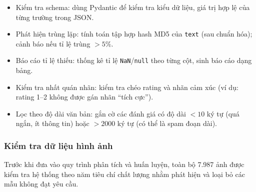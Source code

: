 \begin{itemize}[labelsep=10pt, leftmargin=2cm]
    \item Kiểm tra schema: dùng Pydantic để kiểm tra kiểu dữ liệu, giá trị hợp lệ của từng trường trong JSON.
    \item Phát hiện trùng lặp: tính toán tập hợp hash MD5 của \texttt{text} (sau chuẩn hóa); cảnh báo nếu tỉ lệ trùng $> 5\%$.
    \item Báo cáo tỉ lệ thiếu: thống kê tỉ lệ \texttt{NaN}/\texttt{null} theo từng cột, sinh báo cáo dạng bảng.
    \item Kiểm tra nhất quán nhãn: kiểm tra chéo rating và nhãn cảm xúc (ví dụ: rating 1--2 không được gán nhãn ``tích cực'').
    \item Lọc theo độ dài văn bản: gắn cờ các đánh giá có độ dài $< 10$ ký tự (quá ngắn, ít thông tin) hoặc $> 2000$ ký tự (có thể là spam đoạn dài).
\end{itemize}

\subsubsection{Kiểm tra dữ liệu hình ảnh}
\label{sec:kiem_tra_du_lieu_anh}

Trước khi đưa vào quy trình phân tích và huấn luyện, toàn bộ 7.987 ảnh được kiểm tra hệ thống theo năm tiêu chí chất lượng nhằm phát hiện và loại bỏ các mẫu không đạt yêu cầu.

